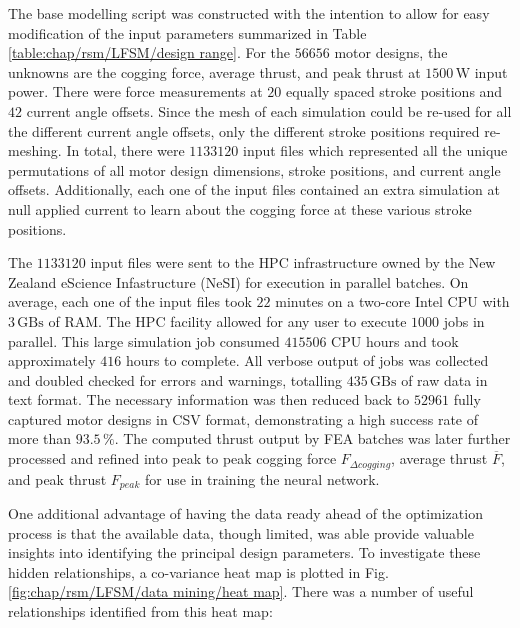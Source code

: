             
            The base modelling script was constructed with the intention to allow for easy modification of the input parameters summarized in Table\,\ref{table:chap/rsm/LFSM/design range}. For the $56656$ motor designs, the unknowns are the cogging force, average thrust, and peak thrust at $1500\,\mathrm{W}$ input power. There were force measurements at $20$ equally spaced stroke positions and $42$ current angle offsets. Since the mesh of each simulation could be re-used for all the different current angle offsets, only the different stroke positions required re-meshing. In total, there were $1133120$ input files which represented all the unique permutations of all motor design dimensions, stroke positions, and current angle offsets. Additionally, each one of the input files contained an extra simulation at null applied current to learn about the cogging force at these various stroke positions. 
            
            
            The $1133120$ input files were sent to the \acf{HPC} infrastructure owned by the New Zealand eScience Infastructure (NeSI) for execution in parallel batches. On average, each one of the input files took $22$ minutes on a two-core Intel CPU with $3\,\mathrm{GBs}$ of RAM. The \acs{HPC} facility allowed for any user to execute $1000$ jobs in parallel. This large simulation job consumed $415506$ CPU hours and took approximately $416$ hours to complete. All verbose output of jobs was collected and doubled checked for errors and warnings, totalling $435\,\mathrm{GBs}$ of raw data in text format. The necessary information was then reduced back to $52961$ fully captured motor designs in CSV format, demonstrating a high success rate of more than $93.5\,\%$. The computed thrust output by \acs{FEA} batches was later further processed and refined into peak to peak cogging force $F_{\Delta cogging}$, average thrust $\overline{F}$, and peak thrust $F_{peak}$ for use in training the neural network.
            
            
            One additional advantage of having the data ready ahead of the optimization process is that the available data, though limited, was able provide valuable insights into identifying the principal design parameters. To investigate these hidden relationships, a co-variance heat map is plotted in Fig.\,\ref{fig:chap/rsm/LFSM/data mining/heat map}. There was a number of useful relationships identified from this heat map:
            
